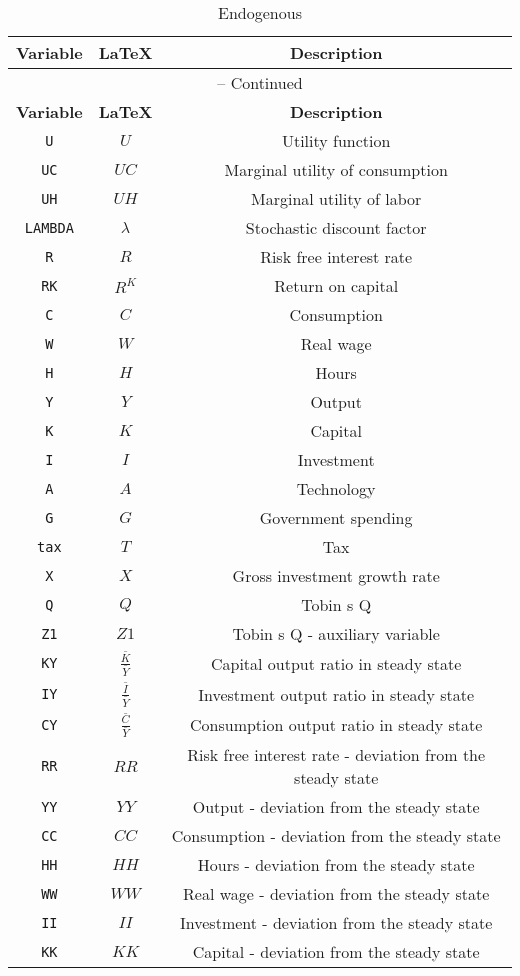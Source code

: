 \begin{center}
\begin{longtable}{ccc}
\caption{Endogenous}\\%
\hline%
\multicolumn{1}{c}{\textbf{Variable}} &
\multicolumn{1}{c}{\textbf{\LaTeX}} &
\multicolumn{1}{c}{\textbf{Description}}\\%
\hline\hline%
\endfirsthead
\multicolumn{3}{c}{{\tablename} \thetable{} -- Continued}\\%
\hline%
\multicolumn{1}{c}{\textbf{Variable}} &
\multicolumn{1}{c}{\textbf{\LaTeX}} &
\multicolumn{1}{c}{\textbf{Description}}\\%
\hline\hline%
\endhead
\texttt{U} & $U$ & Utility function\\
\texttt{UC} & $UC$ & Marginal utility of consumption\\
\texttt{UH} & $UH$ & Marginal utility of labor\\
\texttt{LAMBDA} & $\lambda$ & Stochastic discount factor\\
\texttt{R} & $R$ & Risk free interest rate\\
\texttt{RK} & $R^{K}$ & Return on capital\\
\texttt{C} & $C$ & Consumption\\
\texttt{W} & $W$ & Real wage\\
\texttt{H} & $H$ & Hours\\
\texttt{Y} & $Y$ & Output\\
\texttt{K} & $K$ & Capital\\
\texttt{I} & $I$ & Investment\\
\texttt{A} & $A$ & Technology\\
\texttt{G} & $G$ & Government spending\\
\texttt{tax} & $T$ & Tax\\
\texttt{X} & $X$ & Gross investment growth rate\\
\texttt{Q} & $Q$ & Tobin s Q\\
\texttt{Z1} & $Z1$ & Tobin s Q - auxiliary variable\\
\texttt{KY} & $\frac{\bar{K}}{\bar{Y}}$ & Capital output ratio in steady state\\
\texttt{IY} & $\frac{\bar{I}}{\bar{Y}}$ & Investment output ratio in steady state\\
\texttt{CY} & $\frac{\bar{C}}{\bar{Y}}$ & Consumption output ratio in steady state\\
\texttt{RR} & $RR$ & Risk free interest rate - deviation from the steady state\\
\texttt{YY} & $YY$ & Output - deviation from the steady state\\
\texttt{CC} & $CC$ & Consumption - deviation from the steady state\\
\texttt{HH} & $HH$ & Hours - deviation from the steady state\\
\texttt{WW} & $WW$ & Real wage - deviation from the steady state\\
\texttt{II} & $II$ & Investment - deviation from the steady state\\
\texttt{KK} & $KK$ & Capital - deviation from the steady state\\
\hline%
\end{longtable}
\end{center}

